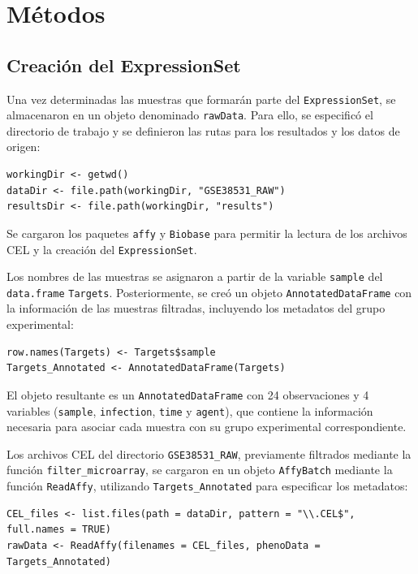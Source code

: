 \documentclass[12pt,a4paper]{article}
\begin{document}
\section{Métodos}

\subsection{Creación del ExpressionSet}

Una vez determinadas las muestras que formarán parte del \texttt{ExpressionSet}, se almacenaron en un objeto denominado \texttt{rawData}. Para ello, se especificó el directorio de trabajo y se definieron las rutas para los resultados y los datos de origen:

\begin{verbatim}
workingDir <- getwd()
dataDir <- file.path(workingDir, "GSE38531_RAW")
resultsDir <- file.path(workingDir, "results")
\end{verbatim}

Se cargaron los paquetes \texttt{affy} y \texttt{Biobase} para permitir la lectura de los archivos CEL y la creación del \texttt{ExpressionSet}.

Los nombres de las muestras se asignaron a partir de la variable \texttt{sample} del \texttt{data.frame} \texttt{Targets}. Posteriormente, se creó un objeto \texttt{AnnotatedDataFrame} con la información de las muestras filtradas, incluyendo los metadatos del grupo experimental:

\begin{verbatim}
row.names(Targets) <- Targets$sample
Targets_Annotated <- AnnotatedDataFrame(Targets)
\end{verbatim}

El objeto resultante es un \texttt{AnnotatedDataFrame} con 24 observaciones y 4 variables (\texttt{sample}, \texttt{infection}, \texttt{time} y \texttt{agent}), que contiene la información necesaria para asociar cada muestra con su grupo experimental correspondiente.

Los archivos CEL del directorio \texttt{GSE38531\_RAW}, previamente filtrados mediante la función \texttt{filter\_microarray}, se cargaron en un objeto \texttt{AffyBatch} mediante la función \texttt{ReadAffy}, utilizando \texttt{Targets\_Annotated} para especificar los metadatos:

\begin{verbatim}
CEL_files <- list.files(path = dataDir, pattern = "\\.CEL$", full.names = TRUE)
rawData <- ReadAffy(filenames = CEL_files, phenoData = Targets_Annotated)
\end{verbatim}
\end{document}
